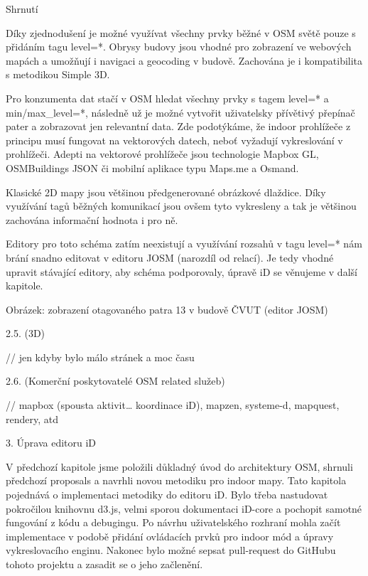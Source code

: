 Shrnutí

Díky zjednodušení je možné využívat všechny prvky běžné v OSM světě pouze s přidáním tagu level=*. Obrysy budovy jsou vhodné pro zobrazení ve webových mapách a umožňují i navigaci a geocoding v budově. Zachována je i kompatibilita s metodikou Simple 3D.

Pro konzumenta dat stačí v OSM hledat všechny prvky s tagem level=* a min/max\_level=*, následně už je možné vytvořit uživatelsky přívětivý přepínač pater a zobrazovat jen relevantní data. Zde podotýkáme, že indoor prohlížeče z principu musí fungovat na vektorových datech, neboť vyžadují vykreslování v prohlížeči. Adepti na vektorové prohlížeče jsou technologie Mapbox GL, OSMBuildings JSON či mobilní aplikace typu Maps.me a Osmand.

Klasické 2D mapy jsou většinou předgenerované obrázkové dlaždice. Díky využívání tagů běžných komunikací jsou ovšem tyto vykresleny a tak je většinou zachována informační hodnota i pro ně.

Editory pro toto schéma zatím neexistují a využívání rozsahů v tagu level=* nám brání snadno editovat v editoru JOSM (narozdíl od relací). Je tedy vhodné upravit stávající editory, aby schéma podporovaly, úpravě iD se věnujeme v další kapitole.



Obrázek: zobrazení otagovaného patra 13 v budově ČVUT (editor JOSM)

2.5. (3D)



// jen kdyby bylo málo stránek a moc času

2.6. (Komerční poskytovatelé OSM related služeb)



// mapbox (spousta aktivit… koordinace iD), mapzen, systeme-d, mapquest, rendery, atd

3. Úprava editoru iD



V předchozí kapitole jsme položili důkladný úvod do architektury OSM, shrnuli předchozí proposals a navrhli novou metodiku pro indoor mapy. Tato kapitola pojednává o implementaci metodiky do editoru iD. Bylo třeba nastudovat pokročilou knihovnu d3.js, velmi sporou dokumentaci iD-core a pochopit samotné fungování z kódu a debugingu. Po návrhu uživatelského rozhraní mohla začít implementace v podobě přidání ovládacích prvků pro indoor mód a úpravy vykreslovacího enginu. Nakonec bylo možné sepsat pull-request do GitHubu tohoto projektu a zasadit se o jeho začlenění.

